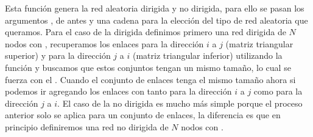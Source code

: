 Esta función genera la red aleatoria dirigida y no dirigida, para ello se pasan los argumentos ,  de antes y una cadena  para la elección del tipo de red aleatoria que queramos. Para el caso de la dirigida definimos primero una red dirigida de $N$ nodos con , recuperamos los enlaces para la dirección $i$ a $j$ (matriz triangular superior) y para la dirección $j$ a $i$ (matriz triangular inferior) utilizando la función  y buscamos que estos conjuntos tengan un mismo tamaño, lo cual se fuerza con el . Cuando el conjunto de enlaces tenga el mismo tamaño ahora si podemos ir agregando los enlaces con  tanto para la dirección $i$ a $j$ como para la dirección $j$ a $i$. El caso de la no dirigida es mucho más simple porque el proceso anterior solo se aplica para un conjunto de enlaces, la diferencia es que en principio definiremos una red no dirigida de $N$ nodos con .

